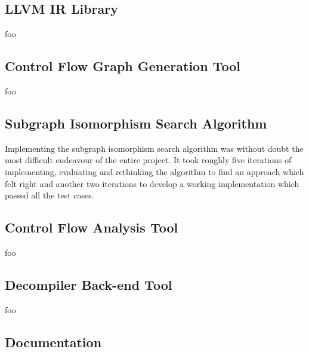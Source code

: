 \documentclass[12pt, a4paper]{article}
\begin{document}
\subsection{LLVM IR Library}

foo


\subsection{Control Flow Graph Generation Tool}

foo


\subsection{Subgraph Isomorphism Search Algorithm}

Implementing the subgraph isomorphism search algorithm was without doubt the most difficult endeavour of the entire project. It took roughly five iterations of implementing, evaluating and rethinking the algorithm to find an approach which felt right and another two iterations to develop a working implementation which passed all the test cases.



\subsection{Control Flow Analysis Tool}

foo


\subsection{Decompiler Back-end Tool}

foo


\subsection{Documentation}
\end{document}
